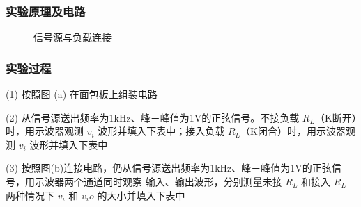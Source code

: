 \documentclass[a4paper,11pt,UTF8]{article}
\begin{document}
\subsubsection{实验原理及电路}

\begin{figure}[H]
	\centering
	\setcounter{subfigure}{0}
	\caption{信号源与负载连接}
\end{figure}

\subsubsection{实验过程}

(1) 按照图 (a) 在面包板上组装电路

(2) 从信号源送出频率为1kHz、峰－峰值为1V的正弦信号。不接负载 $R_L$（K断开）时，用示波器观测 $v_i$ 
波形并填入下表中；接入负载 $R_L$（K闭合）时，用示波器观测 $v_i$ 波形并填入下表中

(3) 按照图(b)连接电路，仍从信号源送出频率为1kHz、峰－峰值为1V的正弦信号，用示波器两个通道同时观察
输入、输出波形，分别测量未接 $R_L$ 和接入 $R_L$ 两种情况下 $v_i$ 和 $v_io$ 的大小并填入下表中
\end{document}
